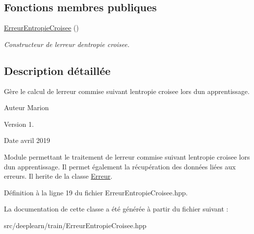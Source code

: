 \subsection*{Fonctions membres publiques}
\begin{DoxyCompactItemize}
\item 
\mbox{\label{class_erreur_entropie_croisee_ae79638c0e11e44100663e83f07273542}} 
\hyperlink{class_erreur_entropie_croisee_ae79638c0e11e44100663e83f07273542}{Erreur\+Entropie\+Croisee} ()
\begin{DoxyCompactList}\small\item\em Constructeur de l\textquotesingle{}erreur d\textquotesingle{}entropie croisee. \end{DoxyCompactList}\end{DoxyCompactItemize}


\subsection{Description détaillée}
Gère le calcul de l\textquotesingle{}erreur commise suivant l\textquotesingle{}entropie croisee lors d\textquotesingle{}un apprentissage. 

\begin{DoxyAuthor}{Auteur}
Marion 
\end{DoxyAuthor}
\begin{DoxyVersion}{Version}
1. 
\end{DoxyVersion}
\begin{DoxyDate}{Date}
avril 2019
\end{DoxyDate}
Module permettant le traitement de l\textquotesingle{}erreur commise suivant l\textquotesingle{}entropie croisee lors d\textquotesingle{}un apprentissage. Il permet également la récupération des données liées aux erreurs. Il herite de la classe \hyperlink{class_erreur}{Erreur}. 

Définition à la ligne 19 du fichier Erreur\+Entropie\+Croisee.\+hpp.



La documentation de cette classe a été générée à partir du fichier suivant \+:\begin{DoxyCompactItemize}
\item 
src/deeplearn/train/Erreur\+Entropie\+Croisee.\+hpp\end{DoxyCompactItemize}

